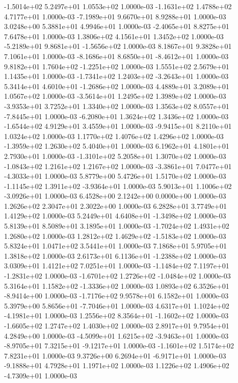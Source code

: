 -1.5014e+02  5.2497e+01  1.0553e+02  1.0000e-03
-1.1631e+02  1.4788e+02  4.7177e+01  1.0000e-03
-7.1989e+01  9.6670e+01  8.9288e+01  1.0000e-03
3.0248e+00 5.3881e+01 4.9946e+01  1.0000e-03
-2.4065e+01  8.8275e+01  7.6478e+01  1.0000e-03
1.3806e+02 4.1561e+01 1.3452e+02  1.0000e-03
-5.2189e+01  9.8681e+01 -1.5656e+02  1.0000e-03
8.1867e+01 9.3828e+01 7.1061e+01  1.0000e-03
-8.1686e+01  8.6850e+01 -8.4612e+01  1.0000e-03
 9.8182e+01  1.7604e+02 -1.2251e+02  1.0000e-03
1.5551e+02 2.5679e+01 1.1435e+01  1.0000e-03
-1.7341e+02  1.2403e+02 -3.2643e+01  1.0000e-03
 5.3414e+01  4.6010e+01 -1.2686e+02  1.0000e-03
4.4889e+01 3.2089e+01 1.0567e+02  1.0000e-03
-3.5614e+01  1.2495e+02  1.3989e+02  1.0000e-03
-3.9353e+01  3.7252e+01  1.3340e+02  1.0000e-03
 1.3563e+02  8.0557e+01 -7.8445e+01  1.0000e-03
-6.2080e+01  1.3624e+02  1.3436e+02  1.0000e-03
-1.6544e+02  4.9129e+01  3.4559e+01  1.0000e-03
-9.9415e+01  8.2110e+01  1.0324e+02  1.0000e-03
1.1770e+02 1.4076e+02 1.4296e+02  1.0000e-03
-1.3959e+02  1.2630e+02  5.4040e+01  1.0000e-03
6.1962e+01 4.1801e+01 2.7930e+01  1.0000e-03
-1.3101e+02  5.2058e+01  1.3070e+02  1.0000e-03
-1.0843e+02  1.2161e+02  1.2167e+02  1.0000e-03
-3.3861e+01  7.0477e+01 -4.3033e+01  1.0000e-03
5.8779e+00 5.4726e+01 1.5170e+02  1.0000e-03
-1.1145e+02  1.3911e+02 -3.9364e+01  1.0000e-03
 5.9013e+01  1.1006e+02 -3.0926e+01  1.0000e-03
6.4528e+00 2.1242e+00 0.0000e+00  1.0000e-03
1.2626e+02 2.3047e+01 2.3022e+00  1.0000e-03
6.2828e+01 3.7749e+01 1.4129e+02  1.0000e-03
 5.2449e+01  4.6408e+01 -1.3498e+02  1.0000e-03
5.8139e+01 8.5089e+01 3.1895e+01  1.0000e-03
-1.7024e+02  1.4931e+02  1.2680e+02  1.0000e-03
 1.2812e+02  1.4629e+02 -1.5183e+02  1.0000e-03
5.8324e+01 1.0471e+02 3.5441e+01  1.0000e-03
7.1868e+01 5.9705e+01 1.3818e+02  1.0000e-03
 2.6173e+01  6.1136e+01 -1.2388e+02  1.0000e-03
3.0309e+01 1.4121e+02 7.0251e+01  1.0000e-03
-1.1484e+02  7.1197e+01 -1.2831e+02  1.0000e-03
-1.6701e+02  1.2726e+02 -1.0484e+02  1.0000e-03
 5.3164e+01  1.1582e+02 -1.3336e+02  1.0000e-03
 1.0893e+02  6.3526e+01 -8.9414e+00  1.0000e-03
-1.7176e+02  9.9578e+01  6.1582e+01  1.0000e-03
 5.3979e+00  5.8656e+01 -7.7046e+01  1.0000e-03
 4.6317e+01  1.1024e+02 -4.1981e+01  1.0000e-03
 1.2556e+02  8.3564e+01 -1.1602e+02  1.0000e-03
-1.6605e+02  1.2747e+02  1.4030e+02  1.0000e-03
2.8917e+01 9.7954e+01 4.2849e+00  1.0000e-03
-4.5099e+01  1.6215e+02 -3.9463e+01  1.0000e-03
-8.9705e+01  7.3215e+01 -9.1217e+01  1.0000e-03
-1.1601e+02  1.5174e+02  7.8231e+01  1.0000e-03
 9.3726e+00  6.2694e+01 -6.9171e+01  1.0000e-03
-9.1888e+01  4.7928e+01  1.1971e+02  1.0000e-03
 1.1226e+02  1.4906e+02 -4.7309e+01  1.0000e-03
